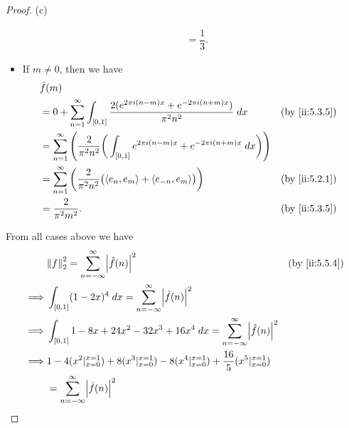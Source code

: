 \begin{proof}{(c)}
\begin{itemize}
\begin{align*}
                       & = \dfrac{1}{3}.
          \end{align*}
    \item If \(m \neq 0\), then we have
          \begin{align*}
             & \hat{f}(m)                                                                                                                                                \\
             & = 0 + \sum_{n = 1}^\infty \int_{[0, 1]} \dfrac{2 (e^{2 \pi i (n - m) x} + e^{- 2 \pi i (n + m) x})}{\pi^2 n^2} \; dx                   &  & \by{ii:5.3.5} \\
             & = \sum_{n = 1}^\infty \Bigg(\dfrac{2}{\pi^2 n^2} \bigg(\int_{[0, 1]} e^{2 \pi i (n - m) x} + e^{- 2 \pi i (n + m) x} \; dx\bigg)\Bigg)                    \\
             & = \sum_{n = 1}^\infty \bigg(\dfrac{2}{\pi^2 n^2} \big(\inner*{e_n, e_m} + \inner*{e_{-n}, e_m}\big)\bigg)                              &  & \by{ii:5.2.1} \\
             & = \dfrac{2}{\pi^2 m^2}.                                                                                                                &  & \by{ii:5.3.5}
          \end{align*}
  \end{itemize}
  From all cases above we have
  \begin{align*}
             & \norm*{f}_2^2 = \sum_{n = -\infty}^\infty \abs{\hat{f}(n)}^2                                                                         &  & \by{ii:5.5.4}                 \\
    \implies & \int_{[0, 1]} (1 - 2x)^4 \; dx = \sum_{n = -\infty}^\infty \abs{\hat{f}(n)}^2                                                                                           \\
    \implies & \int_{[0, 1]} 1 - 8x + 24x^2 - 32x^3 + 16x^4 \; dx = \sum_{n = -\infty}^\infty \abs{\hat{f}(n)}^2                                                                       \\
    \implies & 1 - 4 (x^2|_{x = 0}^{x = 1}) + 8 (x^3|_{x = 0}^{x = 1}) - 8(x^4|_{x = 0}^{x = 1}) + \dfrac{16}{5}(x^5|_{x = 0}^{x = 1})                                                 \\
             & = \sum_{n = -\infty}^\infty \abs{\hat{f}(n)}^2                                                                                                                          \\

\end{align*}
\end{proof}
